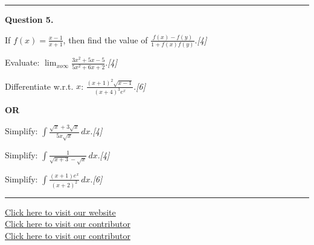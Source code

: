 \documentclass[11pt,a4paper]{article}
\newcommand{\pts}[1]{\hfill   \textit{[#1]}}
\begin{document}
\medskip\rule{\linewidth}{0.2pt}




\noindent   \textbf{Question 5.}

\begin{parts}
  \item If $f(x) = \frac{x-1}{x+1}$, then find the value of $\frac{f(x) - f(y)}{1 + f(x)f(y)}$.\pts{4}
  \item Evaluate: $\lim_{x  o \infty} \frac{3x^2 + 5x - 5}{5x^2 + 6x + 2}$.\pts{4}
  \item Differentiate w.r.t. $x$: $\frac{(x+1)^2 \sqrt{x-1}}{(x+4)^3 e^x}$.\pts{6}
\end{parts}

\centerline{   \textbf{OR}}


\begin{parts}
  \item Simplify: $\int \frac{\sqrt{x} + 3\sqrt{x}}{5x\sqrt{x}} \, dx$.\pts{4}
  \item Simplify: $\int \frac{1}{\sqrt{x+3} - \sqrt{x}} \, dx$.\pts{4}
  \item Simplify: $\int \frac{(x+1)e^x}{(x+2)^2} \, dx$.\pts{6}
\end{parts}

\vfill
\rule{\linewidth}{0.4pt}

\begin{center}\small
\href{https://bhu-exam.vercel.app/}{Click here to visit our website}\\[4pt]
\href{https://me-aryan.vercel.app/}{Click here to visit our contributor}\\[4pt]
\href{https://quashan-me.vercel.app/}{Click here to visit our contributor}
\end{center}
\end{document}

